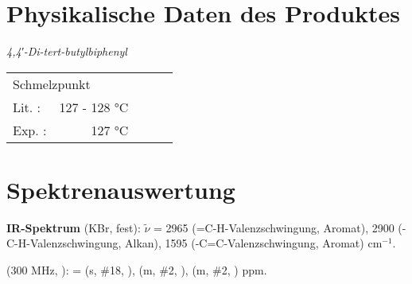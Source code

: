 \documentclass[12pt]{article}
\begin{document}
\begin{onehalfspace}
\section{Physikalische Daten des Produktes} 
\textit{ 4,4′-Di-tert-butylbiphenyl} \\[0.2cm]
\begin{tabular}{ lrclc }
 \multicolumn{2}{l}{Schmelzpunkt} & &   \\
   Lit. \cite{organikum} : &  127 - 128 \si{\celsius}  & &  \\
   Exp. :&  127 \si{\celsius} & &  \\
 \end{tabular}

\section{Spektrenauswertung} 
\textbf{IR-Spektrum} (KBr, fest): $\tilde{\nu}$ = 2965 (=C-H-Valenzschwingung, Aromat), 2900 (-C-H-Valenzschwingung, Alkan), 1595 (-C=C-Valenzschwingung, Aromat) cm$^{-1}$.\\

\begin{experimental}[format=\bfseries,delta=(ppm),list=true,use-equal,pos-number = side]
\begin{minipage}[b]{0.60\textwidth} 
\NMR* (300 \si{\MHz}, ): \chemdelta = 
 (s, \#{18}, ),  (m, \#{2}, ),  (m, \#{2}, ) ppm.
\end{minipage}
 \hfill
\begin{minipage}[t][][b]{0.60\textwidth} 
\end{minipage}
\end{experimental}

\end{onehalfspace}
\end{document}
